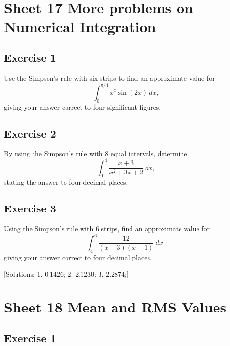 \documentclass[
  english,
  11pt,
  oneside]{book}
\newcommand{\slide}{}
\theoremstyle{definition}
\theoremstyle{definition}
\theoremstyle{definition}
\theoremstyle{definition}
\theoremstyle{remark}
\begin{document}
\section{Sheet 17 More problems on Numerical Integration}\label{sheet-17-more-problems-on-numerical-integration}

\slide

\subsection*{Exercise 1}\label{exercise-1-8}

Use the Simpson's rule with six strips to find an approximate value for
\[\int_0^{\pi/4}x^2\sin(2x)\ dx,\]
giving your answer correct to four significant figures.

\slide

\subsection*{Exercise 2}\label{exercise-2-8}

By using the Simpson's rule with 8 equal intervals, determine
\[\int_0^4\frac{x+3}{x^2+3x+2}\ dx,\]
stating the answer to four decimal places.

\slide

\subsection*{Exercise 3}\label{exercise-3-6}

Using the Simpson's rule with 6 strips, find an approximate value for
\[\int_4^6\frac{12}{(x-3)(x+1)}\ dx,\]
giving your answer correct to four decimal places.

{[}Solutions:
1. \(0.1426\);
2. \(2.1230\);
3. \(2.2874\);{]}

\slide

\section{Sheet 18 Mean and RMS Values}\label{sheet-18-mean-and-rms-values}

\slide

\subsection*{Exercise 1}\label{exercise-1-9}
\end{document}
